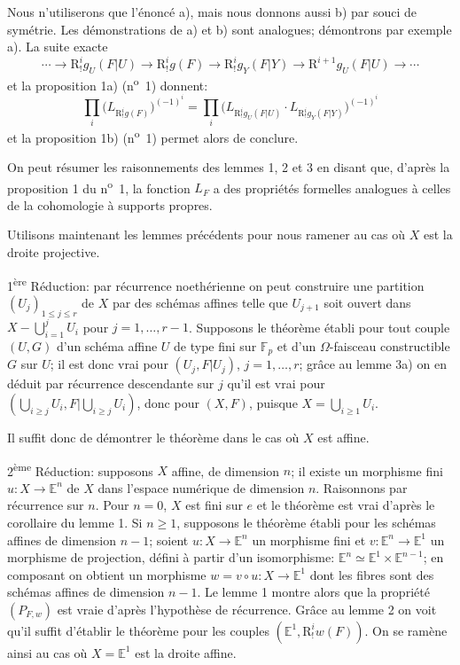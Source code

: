 \documentclass[11pt]{article}
\begin{document}
Nous n'utiliserons que l'énoncé a), mais nous donnons aussi b) par souci de symétrie. Les démonstrations de a) et b) sont analogues; démontrons par exemple a). La suite exacte
\[
\cdots\longrightarrow \mathrm{R}^i_!g_U(F|U)\longrightarrow \mathrm{R}^i_!g(F)
\longrightarrow \mathrm{R}^i_!g_Y(F|Y)\longrightarrow \mathrm{R}^{i+1}g_U(F|U)\longrightarrow\cdots
\]
et la proposition 1a) (n\textsuperscript{o}~1) donnent:
\[
\prod_i\bigl(L_{\mathrm{R}^i_!g(F)}\bigr)^{(-1)^i}
=\prod_i\bigl(L_{\mathrm{R}^i_!g_U(F|U)}\cdot L_{\mathrm{R}^i_!g_Y(F|Y)}\bigr)^{(-1)^i}
\]
et la proposition 1b) (n\textsuperscript{o}~1) permet alors de conclure.

On peut résumer les raisonnements des lemmes 1, 2 et 3 en disant que, d'après la proposition 1 du n\textsuperscript{o}~1, la fonction $L_F$ a des propriétés formelles analogues à celles de la cohomologie à supports 
propres.

Utilisons maintenant les lemmes précédents pour nous ramener au cas où $X$ est la droite projective.

1\textsuperscript{ère} Réduction: par récurrence noethérienne on peut construire une partition $(U_j)_{1\le j\le r}$ de $X$ par des schémas affines telle que $U_{j+1}$ soit ouvert dans $X-\bigcup_{i=1}^jU_i$ pour $j=1,\ldots,r-1$. Supposons le théorème établi pour tout couple $(U,G)$ d'un schéma affine $U$ de type fini sur $\mathbb F_p$ et d'un $\Omega$-faisceau constructible $G$ sur $U$; il est donc vrai pour $(U_j,F|U_j)$, $j=1,\ldots,r$; grâce au lemme 3a) on en déduit par récurrence descendante sur $j$ qu'il est vrai pour $(\bigcup_{i\ge j}U_i,F|\bigcup_{i\ge j}U_i)$, donc pour $(X,F)$, puisque $X=\bigcup_{i\ge1}U_i$.

Il suffit donc de démontrer le théorème dans le cas où $X$ est affine.

2\textsuperscript{ème} Réduction: supposons $X$ affine, de dimension $n$; il existe un morphisme fini $u:X\to\mathbb E^n$ de $X$ dans l'espace numérique de dimension $n$. Raisonnons par récurrence sur $n$. Pour $n=0$, $X$ est fini sur $e$ et le théorème est vrai d'après le corollaire du lemme 1. Si $n\ge1$, supposons le théorème établi pour les schémas affines de dimension $n-1$; soient $u:X\to\mathbb E^n$ un morphisme fini et $v:\mathbb E^n\to\mathbb E^1$ un morphisme de projection, défini à partir d'un isomorphisme: $\mathbb E^n\simeq\mathbb E^1\times\mathbb E^{n-1}$; en composant on obtient un morphisme $w=v\circ u:X\to\mathbb E^1$ dont les fibres sont des schémas affines de dimension $n-1$. Le lemme 1 montre alors que la propriété $(P_{F,w})$ est vraie d'après l'hypothèse de récurrence. Grâce au lemme 2 on voit qu'il suffit d'établir le théorème pour les couples 
$(\mathbb E^1,\mathrm{R}^i_!w(F))$. On se ramène
ainsi au cas où $X=\mathbb E^1$ est la droite affine.
\end{document}
